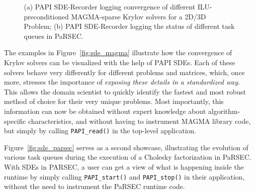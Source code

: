 \vspace{-4pt}
\begin{figure}[!h]
\begin{center}
\caption{(a) PAPI SDE-Recorder logging convergence of different ILU-preconditioned MAGMA-sparse Krylov solvers for a 2D/3D Problem; (b) PAPI SDE-Recorder logging the status of different task queues in PaRSEC.}
\end{center}
\end{figure}
\vspace{-8pt}
%
%
The examples in Figure~\ref{fig:sde_magma} illustrate how the convergence of Krylov solvers can be
visualized with the help of PAPI SDEs. Each of these solvers behave very differently 
for different problems and matrices, which, once more, stresses the importance of 
\emph{exposing these details in a standardized way}. This allows the domain
scientist to quickly identify the fastest and most robust method of choice for 
their very unique problems. Most importantly, this information can now be obtained without 
expert knowledge about algorithm-specific characteristics,
and without having to instrument MAGMA library code, but simply by calling \verb+PAPI_read()+
in the top-level application.

Figure~\ref{fig:sde_parsec} serves as a second showcase, illustrating the evolution of 
various task queues during the execution of a Cholesky factorization in PaRSEC.
With SDEs in PARSEC, a user can get a view of what is happening inside the runtime
by simply calling \verb+PAPI_start()+ and \verb+PAPI_stop()+ in their application, without the need to
instrument the PaRSEC runtime code. 



